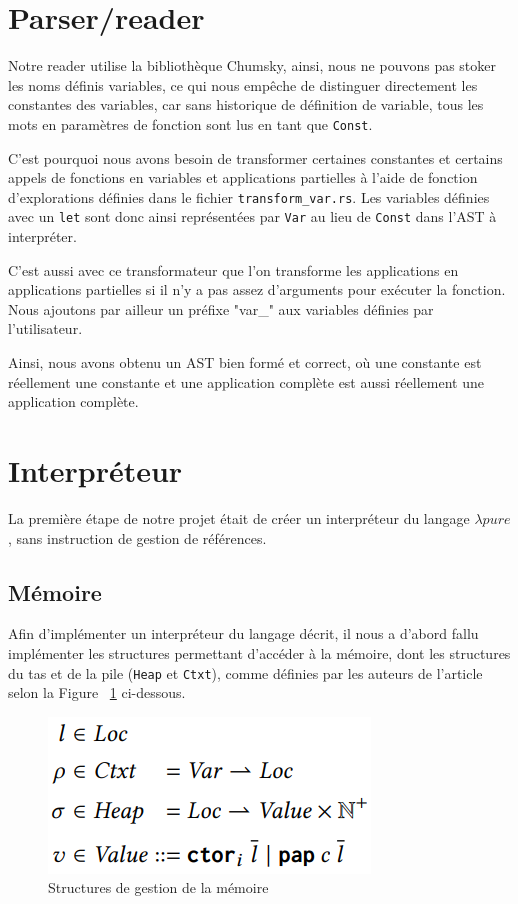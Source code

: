 \documentclass{rapportECL}
\begin{document}
\bigskip

\section{Parser/reader}

Notre reader utilise la bibliothèque Chumsky\cite{zesterer_chumsky_nodate}, ainsi, nous ne pouvons pas stoker les noms définis 
variables, ce qui nous empêche de distinguer directement les constantes des variables, car sans historique de définition de variable, 
tous les mots en paramètres de fonction sont lus en tant que \verb|Const|.

C'est pourquoi nous avons besoin de transformer certaines constantes et certains appels de fonctions en variables et applications partielles à l'aide de 
fonction d'explorations définies dans le fichier \verb|transform_var.rs|.
Les variables définies avec un \verb|let| sont donc ainsi représentées par \verb|Var| au lieu de \verb|Const| dans l'AST à interpréter.

C'est aussi avec ce transformateur que l'on transforme les applications en applications partielles si il n'y a pas assez d'arguments
pour exécuter la fonction. Nous ajoutons par ailleur un préfixe "var\_" aux variables définies par l'utilisateur.

Ainsi, nous avons obtenu un AST bien formé et correct, où une constante est réellement une constante et une application
complète est aussi réellement une application complète.

\section{Interpréteur}

La première étape de notre projet était de créer un interpréteur du langage $\lambda{pure}$, sans instruction de gestion de références.

\subsection{Mémoire}

Afin d'implémenter un interpréteur du langage décrit, il nous a d'abord fallu implémenter les structures permettant d'accéder à la mémoire, 
dont les structures du tas et de la pile (\verb|Heap| et \verb|Ctxt|), comme définies par les auteurs de l'article selon la Figure ~\ref{fig:memory} ci-dessous.

\begin{figure}[hbt!]
	\centering
	\includegraphics[scale=0.80]{logos/figure_strutures_interpreteur.png}
	\caption{Structures de gestion de la mémoire} 
	\label{fig:memory}
\end{figure}
\FloatBarrier 
\end{document}
